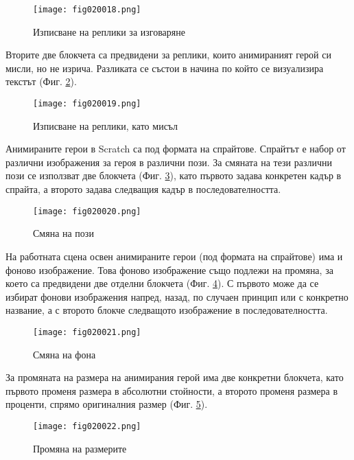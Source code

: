 \begin{figure}[H]
  \centering
  \texttt{[image: fig020018.png]}
  \caption{Изписване на реплики за изговаряне}
\label{fig020018}
\end{figure}

Вторите две блокчета са предвидени за реплики, които анимираният герой си мисли, но не изрича. Разликата се състои в начина по който се визуализира текстът (Фиг. \ref{fig020019}).

\begin{figure}[H]
  \centering
  \texttt{[image: fig020019.png]}
  \caption{Изписване на реплики, като мисъл}
\label{fig020019}
\end{figure}

Анимираните герои в Scratch са под формата на спрайтове. Спрайтът е набор от различни изображения за героя в различни пози. За смяната на тези различни пози се използват две блокчета (Фиг. \ref{fig020020}), като първото задава конкретен кадър в спрайта, а второто задава следващия кадър в последователността.

\begin{figure}[H]
  \centering
  \texttt{[image: fig020020.png]}
  \caption{Смяна на пози}
\label{fig020020}
\end{figure}

На работната сцена освен анимираните герои (под формата на спрайтове) има и фоново изображение. Това фоново изображение също подлежи на промяна, за което са предвидени две отделни блокчета (Фиг. \ref{fig020021}). С първото може да се избират фонови изображения напред, назад, по случаен принцип или с конкретно название, а с второто блокче следващото изображение в последователността. 

\begin{figure}[H]
  \centering
  \texttt{[image: fig020021.png]}
  \caption{Смяна на фона}
\label{fig020021}
\end{figure}

За промяната на размера на анимирания герой има две конкретни блокчета, като първото променя размера в абсолютни стойности, а второто променя размера в проценти, спрямо оригиналния размер (Фиг. \ref{fig020022}).

\begin{figure}[H]
  \centering
  \texttt{[image: fig020022.png]}
  \caption{Промяна на размерите}
\label{fig020022}
\end{figure}

